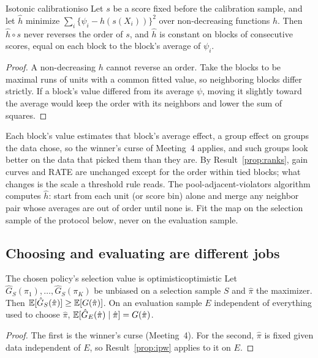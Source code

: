 \documentclass[11pt]{article}
\begin{document}
\begin{prop}{Isotonic calibration}{iso}
Let $s$ be a score fixed before the calibration sample, and let $\hat h$ minimize $\sum_i\{\psi_i - h(s(X_i))\}^2$ over
non-decreasing functions $h$. Then $\hat h \circ s$ never reverses the order of $s$, and $\hat h$ is constant on blocks of
consecutive scores, equal on each block to the block's average of $\psi_i$.
\end{prop}
\begin{proof}
A non-decreasing $h$ cannot reverse an order. Take the blocks to be maximal runs of units with a common fitted value, so
neighboring blocks differ strictly. If a block's value differed from its average $\psi$, moving it slightly toward the
average would keep the order with its neighbors and lower the sum of squares.
\end{proof}

Each block's value estimates that block's average effect, a group effect on groups the data chose, so the winner's
curse of Meeting~4 applies, and such groups look better on the data that picked them than they are. By Result~\ref{prop:ranks}, gain curves and RATE are unchanged except for the order within tied blocks;
what changes is the scale a threshold rule reads. The pool-adjacent-violators algorithm computes $\hat h$: start from each
unit (or score bin) alone and merge any neighbor pair whose averages are out of order until none is. Fit the map on the
selection sample of the protocol below, never on the evaluation sample.

\subsection{Choosing and evaluating are different jobs}

\begin{prop}{The chosen policy's selection value is optimistic}{optimistic}
Let $\hat G_S(\pi_1), \dots, \hat G_S(\pi_K)$ be unbiased on a selection sample $S$ and $\hat\pi$ the maximizer. Then
$\mathbb{E}[\hat G_S(\hat\pi)] \ge \mathbb{E}[G(\hat\pi)]$. On an evaluation sample $E$ independent of everything used to choose $\hat\pi$,
$\mathbb{E}[\hat G_E(\hat\pi) \mid \hat\pi] = G(\hat\pi)$.
\end{prop}
\begin{proof}
The first is the winner's curse (Meeting~4). For the second, $\hat\pi$ is fixed given data independent of $E$, so
Result~\ref{prop:ipw} applies to it on $E$.
\end{proof}
\end{document}
